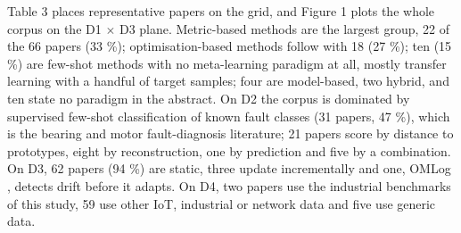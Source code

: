 Table 3 places representative papers on the grid, and Figure 1 plots the whole corpus on the D1 \ensuremath{\times} D3 plane. Metric-based methods are the largest group, 22 of the 66 papers (33 \%); optimisation-based methods follow with 18 (27 \%); ten (15 \%) are few-shot methods with no meta-learning paradigm at all, mostly transfer learning with a handful of target samples; four are model-based, two hybrid, and ten state no paradigm in the abstract. On D2 the corpus is dominated by supervised few-shot classification of known fault classes (31 papers, 47 \%), which is the bearing and motor fault-diagnosis literature; 21 papers score by distance to prototypes, eight by reconstruction, one by prediction and five by a combination. On D3, 62 papers (94 \%) are static, three update incrementally \citep{yue2023incremental, pu2024fseocl, du2024fscil} and one, OMLog \citep{tian2024omlog}, detects drift before it adapts. On D4, two papers \citep{tuli2022tranad, xu2025swat} use the industrial benchmarks of this study, 59 use other IoT, industrial or network data and five use generic data.

